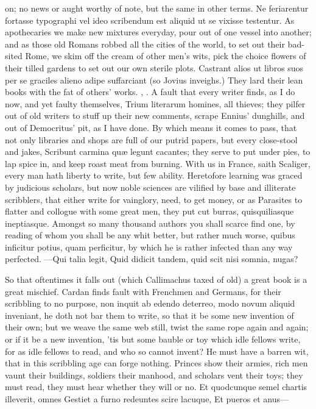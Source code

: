 {on; no news or aught worthy of note, but the same in other terms. Ne
feriarentur fortasse typographi vel ideo scribendum est aliquid ut se
vixisse testentur. As apothecaries we make new mixtures everyday, pour
out of one vessel into another; and as those old Romans robbed all the
cities of the world, to set out their bad-sited Rome, we skim off the
cream of other men's wits, pick the choice flowers of their tilled
gardens to set out our own sterile plots. Castrant alios ut libros suos
per se graciles alieno adipe suffarciant (so Jovius inveighs.) They
lard their lean books with the fat of others' works. ,
\etc. A fault that every writer finds, as I do now, and yet faulty
themselves, Trium literarum homines, all thieves; they pilfer out
of old writers to stuff up their new comments, scrape Ennius'
dunghills, and out of Democritus' pit, as I have done. By which
means it comes to pass, that not only libraries and shops are full
of our putrid papers, but every close-stool and jakes, Scribunt carmina
qu\ae{} legunt cacantes; they serve to put under pies, to lap spice
in, and keep roast meat from burning. With us in France, saith
Scaliger, every man hath liberty to write, but few ability.
Heretofore learning was graced by judicious scholars, but now noble
sciences are vilified by base and illiterate scribblers, that either
write for vainglory, need, to get money, or as Parasites to flatter and
collogue with some great men, they put cut burras, quisquiliasque
ineptiasque. Amongst so many thousand authors you shall scarce find
one, by reading of whom you shall be any whit better, but rather much
worse, quibus inficitur potius, quam perficitur, by which he is rather
infected than any way perfected.
---Qui talia legit,
Quid didicit tandem, quid scit nisi somnia, nugas?

So that oftentimes it falls out (which Callimachus taxed of old) a
great book is a great mischief. Cardan finds fault with Frenchmen
and Germans, for their scribbling to no purpose, non inquit ab edendo
deterreo, modo novum aliquid inveniant, he doth not bar them to write,
so that it be some new invention of their own; but we weave the same
web still, twist the same rope again and again; or if it be a new
invention, 'tis but some bauble or toy which idle fellows write, for as
idle fellows to read, and who so cannot invent? He must have a
barren wit, that in this scribbling age can forge nothing. Princes
show their armies, rich men vaunt their buildings, soldiers their
manhood, and scholars vent their toys; they must read, they must hear
whether they will or no.
Et quodcunque semel chartis illeverit, omnes
Gestiet a furno redeuntes scire lacuque,
Et pueros et anus---

}
